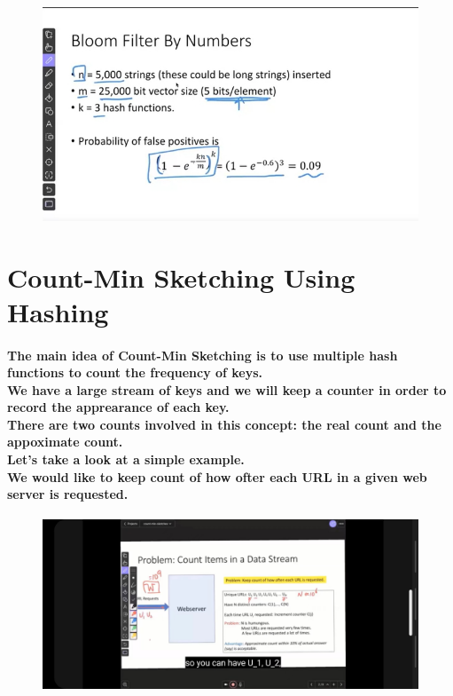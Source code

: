 \documentclass{article}
\begin{document}
\begin{figure}[H]
    \includegraphics[width=\textwidth]{bloomflitersfalsepositive.png}
\end{figure}


\section{Count-Min Sketching Using Hashing}

\paragraph{The main idea of Count-Min Sketching is to use multiple hash functions to count the frequency of keys.\\
We have a large stream of keys and we will keep a counter in order to record the apprearance of each key.\\
There are two counts involved in this concept: the real count and the appoximate count.\\
Let's take a look at a simple example.\\
We would like to keep count of how ofter each URL in a given web server is requested.\\}

\begin{figure}[H]
    \includegraphics[width=\textwidth]{webserver.jpg}
\end{figure}
\end{document}
